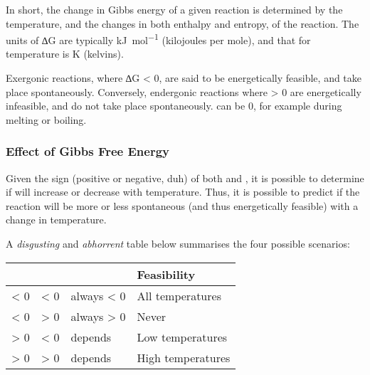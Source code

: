 
		In short, the change in Gibbs energy of a given reaction is determined by the temperature, and the changes in both enthalpy and entropy,
		of the reaction. The units of ∆G are typically \si{\kilo\joule\per\mole} (kilojoules per mole), and that for temperature is \si{\kelvin}
		(kelvins).

		Exergonic reactions, where ∆G < 0, are said to be energetically feasible, and take place spontaneously. Conversely, endergonic
		reactions where \gibb{} > 0 are energetically infeasible, and do not take place spontaneously. \gibb{} can be 0, for example during
		melting or boiling.


		\pagebreak
		\subsubsection{Effect of Gibbs Free Energy}

			Given the sign (positive or negative, duh) of both \enth{} and \entr{}, it is possible to determine if \gibb{} will increase
			or decrease with temperature. Thus, it is possible to predict if the reaction will be more or less spontaneous
			(and thus energetically feasible) with a change in temperature.

			A \emph{disgusting} and \emph{abhorrent} table below summarises the four possible scenarios:

			\begin{center}\begin{table}[htb]\renewcommand{\arraystretch}{1.5}
			\begin{tabu} to \textwidth {| X[c,m] | X[c,m] | X[c,m] | X[c,m] |}

				\hline		\enth{}		&	\entr{}		&	\gibb{}		&		Feasibility			\\

				\hline		< 0			&	< 0			&	always < 0	&		All temperatures	\\
				\hline		< 0			&	> 0			&	always > 0	&				Never		\\
				\hline		> 0			&	< 0			&	depends		&		Low temperatures	\\
				\hline		> 0			&	> 0			&	depends		&		High temperatures	\\
				\hline

			\end{tabu}
			\end{table}\end{center}\vspace{-10mm}

